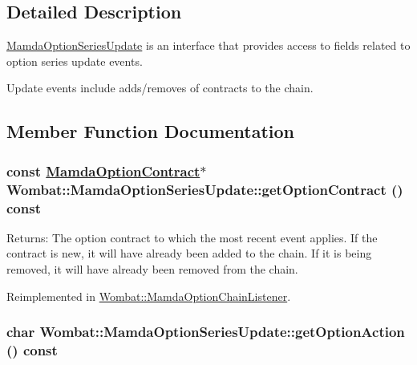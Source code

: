 \subsection{Detailed Description}
\hyperlink{classWombat_1_1MamdaOptionSeriesUpdate}{Mamda\-Option\-Series\-Update} is an interface that provides access to fields related to option series update events. 

Update events include adds/removes of contracts to the chain. 



\subsection{Member Function Documentation}
\hypertarget{classWombat_1_1MamdaOptionSeriesUpdate_9aa226dbd2c289c60828ac1279d8777a}{
\subsubsection[getOptionContract]{\setlength{\rightskip}{0pt plus 5cm}const \hyperlink{classWombat_1_1MamdaOptionContract}{Mamda\-Option\-Contract}$\ast$ Wombat::Mamda\-Option\-Series\-Update::get\-Option\-Contract () const}}
\label{classWombat_1_1MamdaOptionSeriesUpdate_9aa226dbd2c289c60828ac1279d8777a}


\begin{Desc}
\item[Returns:]The option contract to which the most recent event applies. If the contract is new, it will have already been added to the chain. If it is being removed, it will have already been removed from the chain. \end{Desc}


Reimplemented in \hyperlink{classWombat_1_1MamdaOptionChainListener_af867698910e7291e62db6ecc8e47799}{Wombat::Mamda\-Option\-Chain\-Listener}.\hypertarget{classWombat_1_1MamdaOptionSeriesUpdate_ae453033ff713e3a48251f3f747946db}{
\subsubsection[getOptionAction]{\setlength{\rightskip}{0pt plus 5cm}char Wombat::Mamda\-Option\-Series\-Update::get\-Option\-Action () const}}
\label{classWombat_1_1MamdaOptionSeriesUpdate_ae453033ff713e3a48251f3f747946db}


